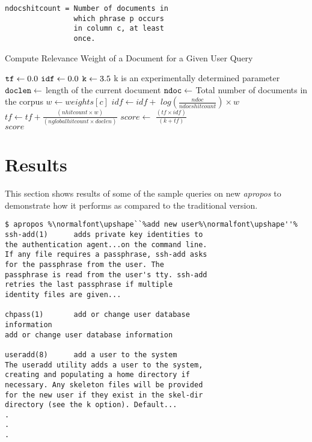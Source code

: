 \documentclass[letterpaper,twocolumn,10pt]{article}
\begin{document}
\begin{description}
{\begin{lstlisting}
ndocshitcount = Number of documents in
                which phrase p occurs
                in column c, at least
                once.
\end{lstlisting}
}
\begin{algorithm}
\caption{Compute Relevance Weight of a Document for a Given User Query}
\label{alg1}
\begin{algorithmic}[1]
\State ${\tt tf} \gets 0.0$
\State ${\tt idf} \gets 0.0$
\State ${\tt k} \gets 3.5$
\Comment 
{k is an experimentally determined parameter}
\State ${\tt doclen} \gets $ length of the current document
\State ${\tt ndoc} \gets $ Total number of documents in the corpus
\State $w \gets weights[c] $
\State $idf \gets idf + $ $log(\frac{ndoc}{ndocshitcount})\times w $
\State $tf \gets tf + \frac{(nhitcount \times w)}{(nglobalhitcount \times doclen)}$
\EndFor
\EndFor
\State $score \gets $ $\frac{(tf \times idf)}{(k + tf)}$ \\
\Return $score$
\end{algorithmic}
\end{algorithm}
\end{description}

\section{Results}
This section shows results of some of the sample queries on new \textit{apropos}
to demonstrate how it performs as compared to the traditional version. \\

{ \small
{}
\begin{lstlisting}
$ apropos %\normalfont\upshape``%add new user%\normalfont\upshape''%
ssh-add(1)      adds private key identities to
the authentication agent...on the command line.
If any file requires a passphrase, ssh-add asks
for the passphrase from the user. The
passphrase is read from the user's tty. ssh-add
retries the last passphrase if multiple
identity files are given...

chpass(1)       add or change user database
information
add or change user database information

useradd(8)      add a user to the system
The useradd utility adds a user to the system,
creating and populating a home directory if
necessary. Any skeleton files will be provided
for the new user if they exist in the skel-dir
directory (see the k option). Default...
.
.
.
\end{lstlisting}
}
\end{document}
